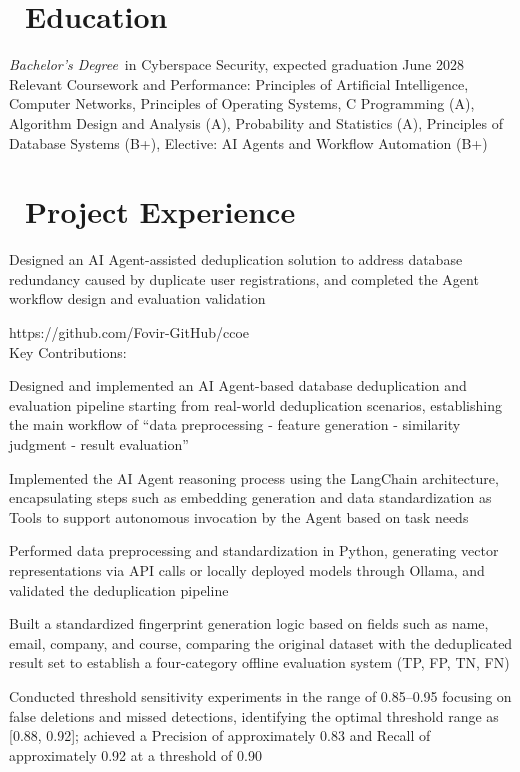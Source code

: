 \documentclass{resume}
\begin{document}
\section{\texorpdfstring{{\normalfont\faGraduationCap}\ }{}Education}
\textit{Bachelor's Degree}\ in Cyberspace Security, expected graduation June 2028\\
Relevant Coursework and Performance: Principles of Artificial Intelligence, Computer Networks, Principles of Operating Systems, C Programming (A), Algorithm Design and Analysis (A), Probability and Statistics (A), Principles of Database Systems (B+), Elective: AI Agents and Workflow Automation (B+)

\section{\texorpdfstring{{\normalfont\faUsers}\ }{}Project Experience}
Designed an AI Agent-assisted deduplication solution to address database redundancy caused by duplicate user registrations, and completed the Agent workflow design and evaluation validation\\
\begin{onehalfspacing}
https://github.com/Fovir-GitHub/ccoe\\
Key Contributions:
\begin{projectitems}
  \item Designed and implemented an AI Agent-based database deduplication and evaluation pipeline starting from real-world deduplication scenarios, establishing the main workflow of ``data preprocessing - feature generation - similarity judgment - result evaluation''
  \item Implemented the AI Agent reasoning process using the LangChain architecture, encapsulating steps such as embedding generation and data standardization as Tools to support autonomous invocation by the Agent based on task needs
  \item Performed data preprocessing and standardization in Python, generating vector representations via API calls or locally deployed models through Ollama, and validated the deduplication pipeline
  \item Built a standardized fingerprint generation logic based on fields such as name, email, company, and course, comparing the original dataset with the deduplicated result set to establish a four-category offline evaluation system (TP, FP, TN, FN)
  \item Conducted threshold sensitivity experiments in the range of 0.85--0.95 focusing on false deletions and missed detections, identifying the optimal threshold range as [0.88, 0.92]; achieved a Precision of approximately 0.83 and Recall of approximately 0.92 at a threshold of 0.90
\end{projectitems}
\end{onehalfspacing}
\projectdivider
\end{document}
